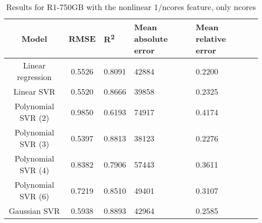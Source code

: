 \begin{table}[H]
\centering
\begin{adjustbox}{center}
\begin{tabular}{c | c M{1.2cm} M{2.5cm} M{2.5cm} M{1.8cm}}
Model & RMSE & R\textsuperscript{2} & Mean absolute error & Mean relative error \tabularnewline
\hline
Linear regression & 0.5526 & 0.8091 &  42884 & 0.2200 \\
Linear SVR & 0.5520 & 0.8666 &  39858 & 0.2325 \\
Polynomial SVR (2) & 0.9850 & 0.6193 &  74917 & 0.4174 \\
Polynomial SVR (3) & 0.5397 & 0.8813 &  38123 & 0.2276 \\
Polynomial SVR (4) & 0.8382 & 0.7906 &  57443 & 0.3611 \\
Polynomial SVR (6) & 0.7219 & 0.8510 &  49401 & 0.3107 \\
Gaussian SVR & 0.5938 & 0.8893 &  42964 & 0.2585 \\
\end{tabular}
\end{adjustbox}
\\
\caption{Results for R1-750GB with the nonlinear 1/ncores feature, only ncores}
\label{tab:all_nonlinear_R1_750}
\end{table}
